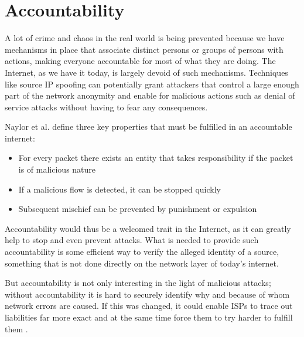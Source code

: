 \documentclass{acm_proc_article-sp}
\begin{document}


\section{Accountability}
\label{sec:acc}
A lot of crime and chaos in the real world is being prevented because we have mechanisms in place that associate distinct persons or groups of persons with actions, making everyone accountable for most of what they are doing. The Internet, as we have it today, is largely devoid of such mechanisms. Techniques like source IP spoofing can potentially grant attackers that control a large enough part of the network anonymity and enable for malicious actions such as denial of service attacks without having to fear any consequences.

Naylor et al. \cite{apip} define three key properties that must be fulfilled in an accountable internet:

\begin{itemize}
\item For every packet there exists an entity that takes responsibility if the packet is of malicious nature
\item If a malicious flow is detected, it can be stopped quickly
\item Subsequent mischief can be prevented by punishment or expulsion
\end{itemize}

Accountability would thus be a welcomed trait in the Internet, as it can greatly help to stop and even prevent attacks. What is needed to provide such accountability is some efficient way to verify the alleged identity of a source, something that is not done directly on the network layer of today's internet. 

But accountability is not only interesting in the light of malicious attacks; without accountability it is hard to securely identify why and because of whom network errors are caused. If this was changed, it could enable ISPs to trace out liabilities far more exact and at the same time force them to try harder to fulfill them \cite{mot}. 
\end{document}
